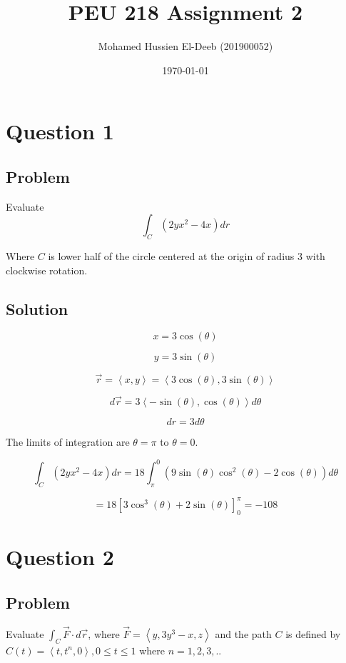 \documentclass[12pt]{article}
\title{PEU 218 Assignment 2}
\author{Mohamed Hussien El-Deeb (201900052)}
\date{\today}
\begin{document}
\maketitle
\tableofcontents
\hypersetup{linkcolor=RoyalBlue4}

\newpage
\section{Question 1}

\subsection{Problem}

Evaluate
\[
    \int_C \left(2y x^2 - 4x\right) d r
\]

Where \(C\) is lower half of the circle centered at the origin of radius 3 with clockwise
rotation.

\subsection{Solution}

\[x = 3 \cos(\theta)\]

\[y = 3 \sin(\theta)\]

\[
    \vec{r} = \left\langle x, y\right\rangle =
    \left\langle 3 \cos(\theta), 3 \sin(\theta)\right\rangle
\]

\[
    d \vec{r} = 3 \left\langle -\sin(\theta), \cos(\theta)\right\rangle d\theta
\]

\[
    d r = 3 d \theta
\]



The limits of integration are \(\theta = \pi \) to \(\theta = 0\).

\[
    \int_C \left(2y x^2 - 4x\right) d r
    = 18 \int_{\pi}^{0} \left(9 \sin(\theta) \cos^2(\theta) - 2 \cos(\theta)\right) d \theta
\]

\[
    = 18 {\left[3 \cos^3(\theta) + 2 \sin(\theta)\right]}_{0}^{\pi}
    = -108
\]

\newpage
\section{Question 2}

\subsection{Problem}

Evaluate \(\int_C \vec{F} \cdot d \vec{r}\), where
\(\vec{F}=\left\langle y, 3y^3 - x, z\right\rangle \) and the path \(C\) is defined by
\(C(t) = \left\langle t, t^n, 0\right\rangle, 0 \leq t \leq 1\) where \(n = 1, 2, 3, .. \)
\end{document}

